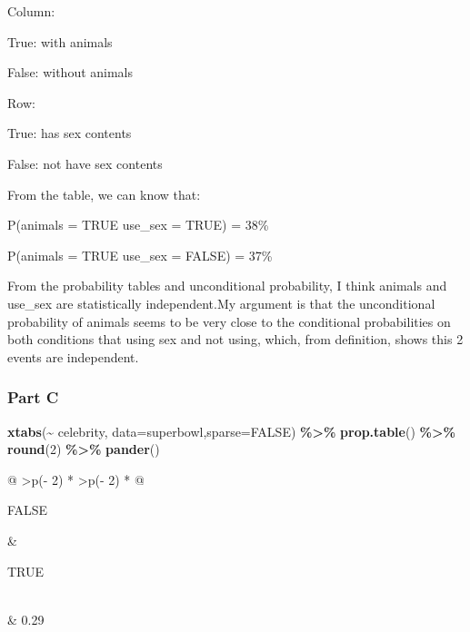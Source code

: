 \documentclass[
]{article}
\newenvironment{Shaded}{\begin{snugshade}}{\end{snugshade}}
\newcommand{\AttributeTok}[1]{\textcolor[rgb]{0.13,0.29,0.53}{#1}}
\newcommand{\ConstantTok}[1]{\textcolor[rgb]{0.56,0.35,0.01}{#1}}
\newcommand{\DecValTok}[1]{\textcolor[rgb]{0.00,0.00,0.81}{#1}}
\newcommand{\FunctionTok}[1]{\textcolor[rgb]{0.13,0.29,0.53}{\textbf{#1}}}
\newcommand{\NormalTok}[1]{#1}
\newcommand{\SpecialCharTok}[1]{\textcolor[rgb]{0.81,0.36,0.00}{\textbf{#1}}}
\begin{document}
Column:

True: with animals

False: without animals

Row:

True: has sex contents

False: not have sex contents

From the table, we can know that:

P(animals = TRUE \textbar{} use\_sex = TRUE) = 38\%

P(animals = TRUE \textbar{} use\_sex = FALSE) = 37\%

From the probability tables and unconditional probability, I think animals and use\_sex are statistically independent.My argument is that the unconditional probability of animals seems to be very close to the conditional probabilities on both conditions that using sex and not using, which, from definition, shows this 2 events are independent.

\hypertarget{part-c}{%
\subsubsection{Part C}\label{part-c}}

\begin{Shaded}
\begin{Highlighting}[]
\FunctionTok{xtabs}\NormalTok{(}\SpecialCharTok{\textasciitilde{}}\NormalTok{ celebrity, }\AttributeTok{data=}\NormalTok{superbowl,}\AttributeTok{sparse=}\ConstantTok{FALSE}\NormalTok{) }\SpecialCharTok{\%\textgreater{}\%} \FunctionTok{prop.table}\NormalTok{() }\SpecialCharTok{\%\textgreater{}\%} \FunctionTok{round}\NormalTok{(}\DecValTok{2}\NormalTok{) }\SpecialCharTok{\%\textgreater{}\%} \FunctionTok{pander}\NormalTok{()}
\end{Highlighting}
\end{Shaded}

\begin{longtable}[]{@{}
  >{\centering\arraybackslash}p{(\columnwidth - 2\tabcolsep) * }
  >{\centering\arraybackslash}p{(\columnwidth - 2\tabcolsep) * }@{}}
\toprule\noalign{}
\begin{minipage}[b]{\linewidth}\centering
FALSE
\end{minipage} & \begin{minipage}[b]{\linewidth}\centering
TRUE
\end{minipage} \\
\midrule\noalign{}
\endhead
\bottomrule\noalign{}
 & 0.29 \\
\end{longtable}
\end{document}

